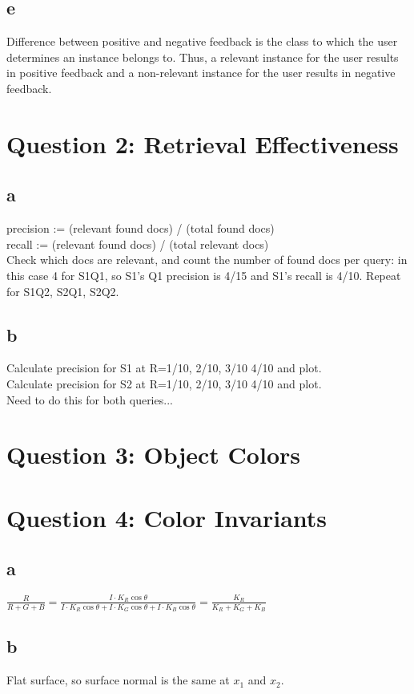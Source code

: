 \documentclass[a4paper,11pt]{article}
\newcommand{\ds}{\displaystyle}
\begin{document}
	\subsection*{e}
		Difference between positive and negative feedback is the class to which the user
		determines an instance belongs to. Thus, a relevant instance for the user results
		in positive feedback and a non-relevant instance  for the user results in negative
		feedback.

	\section*{Question 2: Retrieval Effectiveness}
		\subsection*{a}
			precision := (relevant found docs) / (total found docs)\\
			recall := (relevant found docs) / (total relevant docs)\\
			Check which docs are relevant, and count the number of found docs per query: in
			this case 4 for S1Q1, so S1's Q1 precision is 4/15 and S1's recall is 4/10. Repeat
			for S1Q2, S2Q1, S2Q2.
		\subsection*{b}
			Calculate precision for S1 at R=1/10, 2/10, 3/10 4/10 and plot.\\
			Calculate precision for S2 at R=1/10, 2/10, 3/10 4/10 and plot.\\
			Need to do this for both queries...

	\section*{Question 3: Object Colors}

	\section*{Question 4: Color Invariants}
	\subsection*{a}
		$\ds\frac{R}{R + G + B} = \ds\frac{I \cdot K_R \cos \theta}{I \cdot K_R \cos \theta + I \cdot K_G \cos \theta + I \cdot K_B \cos \theta} = \ds\frac{K_R}{K_R + K_G + K_B}$
	\subsection*{b}
		Flat surface, so surface normal is the same at $x_1$ and $x_2$.
\end{document}
